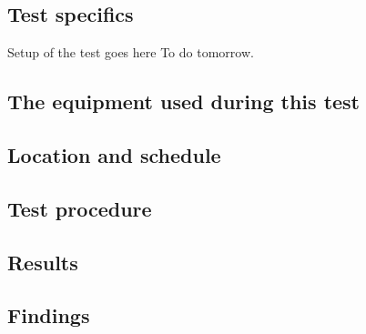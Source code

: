 \subsection{Test specifics}
Setup of the test goes here To do tomorrow.

\subsection*{The equipment used during this test}

\subsection*{Location and schedule}

\subsection*{Test procedure}

\subsection{Results}

\subsection{Findings}


